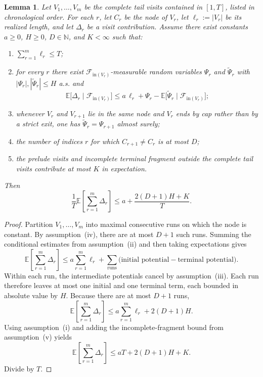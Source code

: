 \documentclass[12pt]{article}
\newtheorem{lemma}[theorem]{Lemma}
\theoremstyle{definition}
\newcommand{\N}{\mathbb{N}}
\newcommand{\E}{\mathbb{E}}
\newcommand{\1}{\mathbf{1}}
\newcommand{\cF}{\mathcal{F}}
\begin{document}
\begin{lemma}
\label{lem:aggregation}
Let $V_1,\dots,V_m$ be the complete tail visits contained in $[1,T]$, listed in
chronological order. For each $r$, let $C_r$ be the node of $V_r$,
let $\ell_r:=|V_r|$ be its realized length, and let $\Delta_r$ be a visit
contribution.
Assume there exist constants $a\ge 0$, $H\ge 0$, $D\in\N$, and $K<\infty$ such
that:
\begin{enumerate}[label=\textnormal{(\roman*)},leftmargin=2.6em]
\item $\sum_{r=1}^m \ell_r\le T$;
\item for every $r$ there exist $\cF_{\mathrm{in}(V_r)}$-measurable random
variables $\Psi_r$ and $\widetilde\Psi_r$ with
$|\Psi_r|,|\widetilde\Psi_r|\le H$ a.s. and
\[
\E\bigl[\Delta_r\mid \cF_{\mathrm{in}(V_r)}\bigr]
\le
a\,\ell_r
+
\Psi_r-\E\bigl[\widetilde\Psi_r\mid \cF_{\mathrm{in}(V_r)}\bigr];
\]
\item whenever $V_r$ and $V_{r+1}$ lie in the same node and $V_r$ ends by cap
rather than by a strict exit, one has
$\widetilde\Psi_r=\Psi_{r+1}$ almost surely;
\item the number of indices $r$ for which $C_{r+1}\neq C_r$ is at most $D$;
\item the prelude visits and incomplete terminal fragment outside the complete
tail visits contribute at most $K$ in expectation.
\end{enumerate}
Then
\[
\frac1T\E\left[\sum_{r=1}^m \Delta_r\right]
\le a + \frac{2(D+1)H+K}{T}.
\]
\end{lemma}

\begin{proof}
Partition $V_1,\dots,V_m$ into maximal consecutive runs on which the node is
constant. By assumption~(iv), there are at most $D+1$ such runs. Summing the
conditional estimates from assumption~(ii) and then taking expectations gives
\[
\E\left[\sum_{r=1}^m \Delta_r\right]
\le
a\sum_{r=1}^m \ell_r
+
\sum_{\text{runs}}
\bigl(\text{initial potential} - \text{terminal potential}\bigr).
\]
Within each run, the intermediate potentials cancel by assumption~(iii). Each
run therefore leaves at most one initial and one terminal term, each bounded in
absolute value by $H$. Because there are at most $D+1$ runs,
\[
\E\left[\sum_{r=1}^m \Delta_r\right]
\le
a\sum_{r=1}^m \ell_r + 2(D+1)H.
\]
Using assumption~(i) and adding the incomplete-fragment bound from
assumption~(v) yields
\[
\E\left[\sum_{r=1}^m \Delta_r\right]
\le
aT + 2(D+1)H + K.
\]
Divide by $T$.
\end{proof}
\end{document}
